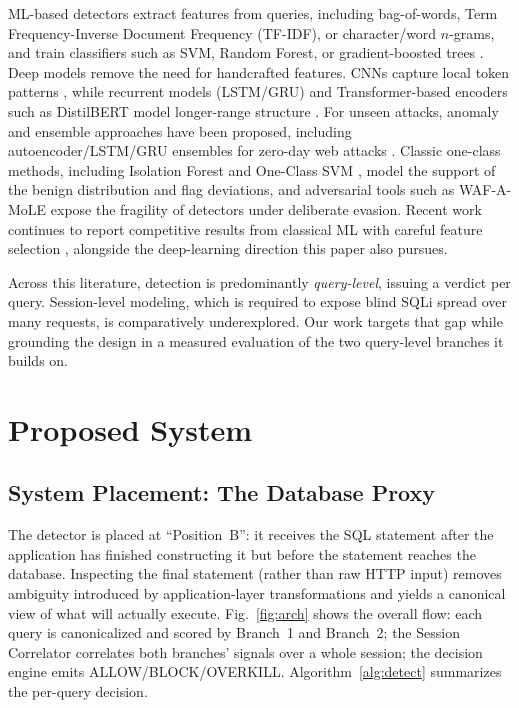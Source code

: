 \documentclass[conference]{IEEEtran}
\begin{document}
ML-based detectors extract features from queries, including bag-of-words, Term Frequency-Inverse Document Frequency (TF-IDF), or character/word $n$-grams, and train classifiers such as SVM, Random Forest, or gradient-boosted trees \cite{b2}. Deep models remove the need for handcrafted features. CNNs capture local token patterns \cite{b3}, while recurrent models (LSTM/GRU) and Transformer-based encoders such as DistilBERT model longer-range structure \cite{b5,b6,b7,b8}. For unseen attacks, anomaly and ensemble approaches have been proposed, including autoencoder/LSTM/GRU ensembles for zero-day web attacks \cite{b4}. Classic one-class methods, including Isolation Forest \cite{b9} and One-Class SVM \cite{b10}, model the support of the benign distribution and flag deviations, and adversarial tools such as WAF-A-MoLE \cite{b11} expose the fragility of detectors under deliberate evasion. Recent work continues to report competitive results from classical ML with careful feature selection \cite{b14,b15}, alongside the deep-learning direction this paper also pursues.

Across this literature, detection is predominantly \emph{query-level}, issuing a verdict per query. Session-level modeling, which is required to expose blind SQLi spread over many requests, is comparatively underexplored. Our work targets that gap while grounding the design in a measured evaluation of the two query-level branches it builds on.

\section{Proposed System}\label{sec:system}

\subsection{System Placement: The Database Proxy}
The detector is placed at ``Position~B'': it receives the SQL statement after the application has finished constructing it but before the statement reaches the database. Inspecting the final statement (rather than raw HTTP input) removes ambiguity introduced by application-layer transformations and yields a canonical view of what will actually execute. Fig.~\ref{fig:arch} shows the overall flow: each query is canonicalized and scored by Branch~1 and Branch~2; the Session Correlator correlates both branches' signals over a whole session; the decision engine emits ALLOW/BLOCK/OVERKILL. Algorithm~\ref{alg:detect} summarizes the per-query decision.
\end{document}
